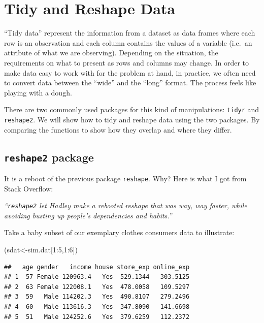 \documentclass[]{book}
\newenvironment{Shaded}{\begin{snugshade}}{\end{snugshade}}
\newcommand{\DecValTok}[1]{\textcolor[rgb]{0.00,0.00,0.81}{{#1}}}
\newcommand{\NormalTok}[1]{{#1}}
\theoremstyle{definition}
\theoremstyle{definition}
\theoremstyle{remark}
\begin{document}
\section{Tidy and Reshape Data}\label{tidy-and-reshape-data}

``Tidy data'' represent the information from a dataset as data frames
where each row is an observation and each column contains the values of
a variable (i.e.~an attribute of what we are observing). Depending on
the situation, the requirements on what to present as rows and columns
may change. In order to make data easy to work with for the problem at
hand, in practice, we often need to convert data between the ``wide''
and the ``long'' format. The process feels like playing with a dough.

There are two commonly used packages for this kind of manipulations:
\texttt{tidyr} and \texttt{reshape2}. We will show how to tidy and
reshape data using the two packages. By comparing the functions to show
how they overlap and where they differ.

\subsection{\texorpdfstring{\texttt{reshape2}
package}{reshape2 package}}\label{reshape2-package}

It is a reboot of the previous package \texttt{reshape}. Why? Here is
what I got from Stack Overflow:

\emph{``\texttt{reshape2} let Hadley make a rebooted reshape that was
way, way faster, while avoiding busting up people's dependencies and
habits.''}

Take a baby subset of our exemplary clothes consumers data to
illustrate:

\begin{Shaded}
\begin{Highlighting}[]
\NormalTok{(sdat<-sim.dat[}\DecValTok{1}\NormalTok{:}\DecValTok{5}\NormalTok{,}\DecValTok{1}\NormalTok{:}\DecValTok{6}\NormalTok{])}
\end{Highlighting}
\end{Shaded}

\begin{verbatim}
##   age gender   income house store_exp online_exp
## 1  57 Female 120963.4   Yes  529.1344   303.5125
## 2  63 Female 122008.1   Yes  478.0058   109.5297
## 3  59   Male 114202.3   Yes  490.8107   279.2496
## 4  60   Male 113616.3   Yes  347.8090   141.6698
## 5  51   Male 124252.6   Yes  379.6259   112.2372
\end{verbatim}
\end{document}
